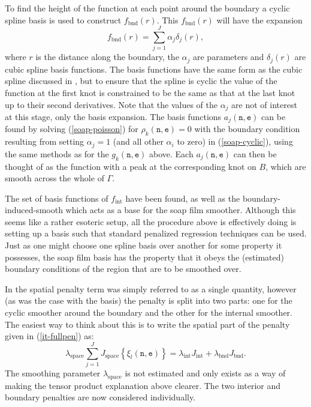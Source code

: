 To find the height of the function at each point around the boundary a cyclic spline basis is used to construct $f_\text{bnd}(r)$. This $f_\text{bnd}(r)$ will have the expansion
\begin{equation}
f_\text{bnd}(r)=\sum_{j=1}^J \alpha_j \delta_j(r),
\label{soap-cyclic}
\end{equation}
where $r$ is the distance along the boundary, the $\alpha_j$ are parameters and $\delta_j(r)$ are cubic spline basis functions. The basis functions have the same form as the cubic spline discussed in , but to ensure that the spline is cyclic the value of the function at the first knot is constrained to be the same as that at the last knot up to their second derivatives. Note that  the values of the $\alpha_j$ are not of interest at this stage, only the basis expansion. The basis functions $a_j(\texttt{n},\texttt{e})$ can be found by solving (\ref{soap-poisson}) for $\rho_k(\texttt{n},\texttt{e})= 0$ with the boundary condition resulting from setting $\alpha_j=1$ (and all other $\alpha_i$ to zero) in (\ref{soap-cyclic}), using the same methods as for the $g_k(\texttt{n},\texttt{e})$ above. Each $a_j(\texttt{n},\texttt{e})$ can then be thought of as the function with a peak at the corresponding knot on $B$, which are smooth across the whole of $\Gamma$.

The set of basis functions of $f_\text{int}$ have been found, as well as the boundary-induced-smooth which acts as a base for the soap film smoother. Although this seems like a rather esoteric setup, all the procedure above is effectively doing is setting up a basis such that standard penalized regression techniques can be used. Just as one might choose one spline basis over another for some property it possesses, the soap film basis has the property that it obeys the (estimated) boundary conditions of the region that are to be smoothed over.

In  the spatial penalty term was simply referred to as a single quantity, however (as was the case with the basis) the penalty is split into two parts: one for the cyclic smoother around the boundary and the other for the internal smoother. The easiest way to think about this is to write the spatial part of the penalty given in (\ref{it-fullpen}) as:
\begin{equation*}
\lambda_\text{space} \sum_{j=1}^J J_\text{space}\left\{  \xi_l(\texttt{n},\texttt{e}) \right\} = \lambda_\text{int} J_\text{int} + \lambda_\text{bnd} J_\text{bnd}.
\end{equation*}
The smoothing parameter $\lambda_\text{space}$ is not estimated and only exists as a way of making the tensor product explanation above clearer. The two interior and boundary penalties are now considered individually.

